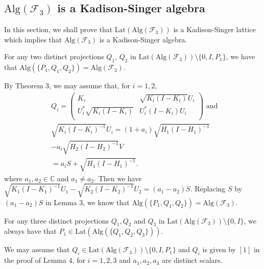 \documentclass{pnastwo}
\newenvironment{proof}[1][Proof]{\begin{trivlist}
\item[\hskip \labelsep {\bfseries #1}]}{\end{trivlist}}
\newcommand{\F}{\mathcal F}
\newcommand{\Lat}{\mathrm{Lat}}
\newcommand{\Alg}{\mathrm{Alg}}
\newcommand{\C}{\mathbb C} %
\begin{document}
\begin{article}
\section{ $\Alg(\F_3)$ is a Kadison-Singer algebra}

In this section, we shall prove that $\Lat(\Alg(\F_3))$
is a Kadison-Singer lattice which implies that $\Alg(\F_3)$ is a
Kadison-Singer algebra.

\begin{lemma}
For any two distinct
projections $Q_{1}$, $Q_{2}$ in $\Lat(\Alg(\F_3)) \setminus \{0,
I, P_{1}\}$, we have that $\Alg(\{P_{1}, Q_{1}, Q_{2}\}) =
\Alg(\F_3)$.
\end{lemma}

\begin{proof}
By Theorem 3, we may assume that,
for $i=1,2$,
\begin{equation}\label{(*)}
\begin{split}
&Q_{i} =\left(
          \begin{array}{cc}
            K_{i} & \sqrt{K_{i}(I-K_{i})}U_{i} \\
            U_{i}^{*}\sqrt{K_{i}(I-K_{i})} & U_{i}^{*}(I-K_{i})U_{i} \\
          \end{array}
        \right) \mbox{ and } \\
&\sqrt{K_{i}(I-K_{i})^{-1}} U_{i} =
(1+a_i)\sqrt{H_{1}(I-H_{1})^{-1}} \\ &-
a_i\sqrt{H_{2}(I-H_{2})^{-1}}V \\
&=a_{i}S +
\sqrt{H_{1}(I-H_{1})^{-1}}.
\end{split}
\end{equation}
where $a_{1}, a_{2}\in\C$  and $a_{1} \neq a_{2}$. Then we have
$\sqrt{K_{1}(I-K_{1})^{-1}}U_{1} - \sqrt{K_{2}(I-K_{2})^{-1}}U_{2}
= (a_{1} - a_{2})S$. Replacing $S$ by $(a_1-a_2)S$ in Lemma 3,
we know that $\Alg(\{P_{1}, Q_{1}, Q_{2}\}) =
\Alg(\F_3)$.
\end{proof}

\begin{lemma}
For any three distinct
projections $Q_1, Q_2$ and $Q_3$ in $\Lat(\Alg(\F_3)) \setminus
\{0, I \}$, we always have that $P_{1} \in \Lat(\Alg(\{Q_{1},
Q_{2}, Q_{3}\}))$.
\end{lemma}

\begin{proof}
We may assume that $Q_{i} \in
\Lat(\Alg(\F_3))\setminus \{0, I, P_{1}\}$ and $Q_i$ is given by
$[1]$ in the proof of Lemma 4, for $i=1,2,3$ and $a_{1}, a_{2},
a_3$ are distinct scalars.


\end{proof}
\end{article}
\end{document}
